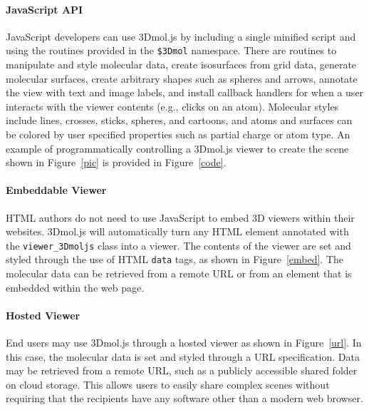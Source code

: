 \documentclass[]{bioinfo}
\begin{document}
\paragraph{JavaScript API}  JavaScript developers can use 3Dmol.js by including a single minified script and using the routines provided in the \texttt{\$3Dmol} namespace. There are routines to manipulate and style molecular data, create isosurfaces from grid data, generate molecular surfaces, create arbitrary shapes such as spheres and arrows, annotate the view with text and image labels, and install callback handlers for when a user interacts with the viewer contents (e.g., clicks on an atom). Molecular styles include lines, crosses, sticks, spheres, and cartoons, and atoms and surfaces can be colored by user specified properties such as partial charge or atom type.   An example of programmatically controlling a 3Dmol.js viewer to create the scene shown in Figure~\ref{pic} is provided in Figure~\ref{code}.

\paragraph{Embeddable Viewer} HTML authors do not need to use JavaScript to embed 3D viewers within their websites.  3Dmol.js will automatically turn any HTML element annotated with the \texttt{viewer\_3Dmoljs} class into a viewer.  The contents of the viewer are set and styled through the use of HTML \texttt{data} tags, as shown in Figure~\ref{embed}.  The molecular data can be retrieved from a remote URL or from an element that is embedded within the web page.

\paragraph{Hosted Viewer} End users may use 3Dmol.js through a hosted viewer as shown in Figure~\ref{url}. In this case, the molecular data is set and styled through a URL specification.  Data may be retrieved from a remote URL, such as a publicly accessible shared folder on cloud storage.  This allows users to easily share complex scenes without requiring that the recipients have any software other than a modern web browser. 
\end{document}
